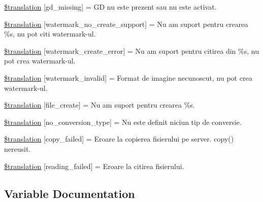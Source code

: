 \begin{DoxyCompactItemize}
\item 
\hyperlink{class_8upload_8ro___r_o_8php_a7f3dfcc0db4bbc0f2e7210c439798e56}{\$translation} \mbox{[}\textquotesingle{}gd\+\_\+missing\textquotesingle{}\mbox{]} = \textquotesingle{}G\+D nu este prezent sau nu este activat.\textquotesingle{}
\item 
\hyperlink{class_8upload_8ro___r_o_8php_a82d5853430ab72dc1f9799ec36144cc6}{\$translation} \mbox{[}\textquotesingle{}watermark\+\_\+no\+\_\+create\+\_\+support\textquotesingle{}\mbox{]} = \textquotesingle{}Nu am suport pentru crearea \%s, nu pot citi watermark-\/ul.\textquotesingle{}
\item 
\hyperlink{class_8upload_8ro___r_o_8php_aabca0b65dadbc6184415c16375f284ca}{\$translation} \mbox{[}\textquotesingle{}watermark\+\_\+create\+\_\+error\textquotesingle{}\mbox{]} = \textquotesingle{}Nu am suport pentru citirea din \%s, nu pot crea watermark-\/ul.\textquotesingle{}
\item 
\hyperlink{class_8upload_8ro___r_o_8php_ac336e7a5701e47ba4a05e9e498a3cc44}{\$translation} \mbox{[}\textquotesingle{}watermark\+\_\+invalid\textquotesingle{}\mbox{]} = \textquotesingle{}Format de imagine necunoscut, nu pot crea watermark-\/ul.\textquotesingle{}
\item 
\hyperlink{class_8upload_8ro___r_o_8php_a1ecb4673e4fb69e06b3f20b65cecf30a}{\$translation} \mbox{[}\textquotesingle{}file\+\_\+create\textquotesingle{}\mbox{]} = \textquotesingle{}Nu am suport pentru crearea \%s.\textquotesingle{}
\item 
\hyperlink{class_8upload_8ro___r_o_8php_a4712d7ec28e9a7f17eb3338af2358363}{\$translation} \mbox{[}\textquotesingle{}no\+\_\+conversion\+\_\+type\textquotesingle{}\mbox{]} = \textquotesingle{}Nu este definit niciun tip de conversie.\textquotesingle{}
\item 
\hyperlink{class_8upload_8ro___r_o_8php_a783c9358bcf54a054545b50098bc679b}{\$translation} \mbox{[}\textquotesingle{}copy\+\_\+failed\textquotesingle{}\mbox{]} = \textquotesingle{}Eroare la copierea fisierului pe server. copy() nereusit.\textquotesingle{}
\item 
\hyperlink{class_8upload_8ro___r_o_8php_a01bea14c9fd5f353f62db44beabfcd42}{\$translation} \mbox{[}\textquotesingle{}reading\+\_\+failed\textquotesingle{}\mbox{]} = \textquotesingle{}Eroare la citirea fisierului.\textquotesingle{}
\end{DoxyCompactItemize}


\subsection{Variable Documentation}
\hypertarget{class_8upload_8ro___r_o_8php_a1f198d410fecc3871ebdd468d343a5e3}{}
